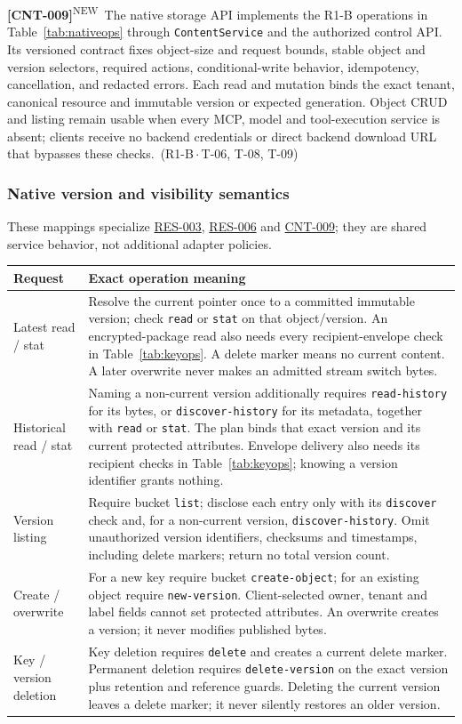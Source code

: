 \documentclass[11pt,a4paper]{article}
\newcommand{\code}[1]{{\small\nolinkurl{#1}}}
\newcommand{\rr}[1]{\hyperlink{req:#1}{#1}}
\newcommand{\reqtag}[2]{{\footnotesize\color{accent}(#1\,$\cdot$\,#2)}}
\newcommand{\reqn}[4]{\par\noindent\hypertarget{req:#1}{\textbf{[#1]}}\textsuperscript{\color{accent}\tiny NEW}\ #4\ \reqtag{#2}{#3}\par}
\begin{document}
\reqn{CNT-009}{R1-B}{T-06, T-08, T-09}{The native storage API implements the R1-B operations in Table~\ref{tab:nativeops} through \code{ContentService} and the authorized control API. Its versioned contract fixes object-size and request bounds, stable object and version selectors, required actions, conditional-write behavior, idempotency, cancellation, and redacted errors. Each read and mutation binds the exact tenant, canonical resource and immutable version or expected generation. Object CRUD and listing remain usable when every MCP, model and tool-execution service is absent; clients receive no backend credentials or direct backend download URL that bypasses these checks.}

\subsubsection{Native version and visibility semantics}
These mappings specialize \rr{RES-003}, \rr{RES-006} and \rr{CNT-009}; they are shared service behavior, not additional adapter policies.
\begin{longtable}{@{}P{0.23\textwidth}P{0.65\textwidth}@{}}
\toprule Request & Exact operation meaning\\\midrule\endhead
Latest read / stat & Resolve the current pointer once to a committed immutable version; check \code{read} or \code{stat} on that object/version. An encrypted-package read also needs every recipient-envelope check in Table~\ref{tab:keyops}. A delete marker means no current content. A later overwrite never makes an admitted stream switch bytes.\\
Historical read / stat & Naming a non-current version additionally requires \code{read-history} for its bytes, or \code{discover-history} for its metadata, together with \code{read} or \code{stat}. The plan binds that exact version and its current protected attributes. Envelope delivery also needs its recipient checks in Table~\ref{tab:keyops}; knowing a version identifier grants nothing.\\
Version listing & Require bucket \code{list}; disclose each entry only with its \code{discover} check and, for a non-current version, \code{discover-history}. Omit unauthorized version identifiers, checksums and timestamps, including delete markers; return no total version count.\\
Create / overwrite & For a new key require bucket \code{create-object}; for an existing object require \code{new-version}. Client-selected owner, tenant and label fields cannot set protected attributes. An overwrite creates a version; it never modifies published bytes.\\
Key / version deletion & Key deletion requires \code{delete} and creates a current delete marker. Permanent deletion requires \code{delete-version} on the exact version plus retention and reference guards. Deleting the current version leaves a delete marker; it never silently restores an older version.\\
\bottomrule
\end{longtable}
\end{document}
